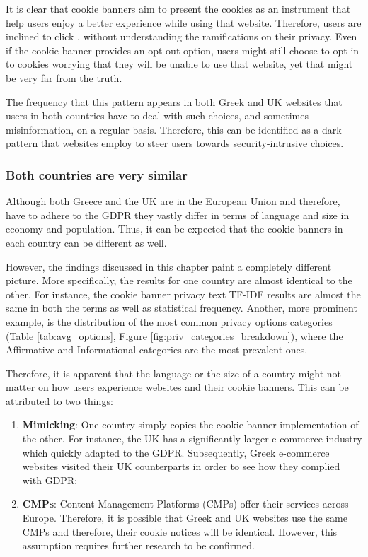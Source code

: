\documentclass[../main.tex]{subfiles}
\begin{document}
It is clear that cookie banners aim to present the cookies as an instrument that help users enjoy a better experience while using that website. Therefore, users are inclined to click , without understanding the ramifications on their privacy. Even if the cookie banner provides an opt-out option, users might still choose to opt-in to cookies worrying that they will be unable to use that website, yet that might be very far from the truth.

The frequency that this pattern appears in both Greek and UK websites that users in both countries have to deal with such choices, and sometimes misinformation, on a regular basis. Therefore, this can be identified as a dark pattern that websites employ to steer users towards security-intrusive choices.

\subsubsection{Both countries are very similar}
Although both Greece and the UK are in the European Union and therefore, have to adhere to the GDPR they vastly differ in terms of language and size in economy and population. Thus, it can be expected that the cookie banners in each country can be different as well.

However, the findings discussed in this chapter paint a completely different picture. More specifically, the results for one country are almost identical to the other. For instance, the cookie banner privacy text TF-IDF results are almost the same in both the terms as well as statistical frequency. Another, more prominent example, is the distribution of the most common privacy options categories (Table \ref{tab:avg_options}, Figure \ref{fig:priv_categories_breakdown}), where the Affirmative and Informational categories are the most prevalent ones. 

Therefore, it is apparent that the language or the size of a country might not matter on how users experience websites and their cookie banners. This can be attributed to two things:

\begin{enumerate}
    \item \textbf{Mimicking}: One country simply copies the cookie banner implementation of the other. For instance, the UK has a significantly larger e-commerce industry which quickly adapted to the GDPR. Subsequently, Greek e-commerce websites visited their UK counterparts in order to see how they complied with GDPR;
    \item \textbf{CMPs}: Content Management Platforms (CMPs) offer their services across Europe. Therefore, it is possible that Greek and UK websites use the same CMPs and therefore, their cookie notices will be identical. However, this assumption requires further research to be confirmed.
\end{enumerate}
\end{document}
